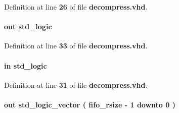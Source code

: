 Definition at line {\bf 26} of file {\bf decompress.\+vhd}.

\paragraph[{rdempty}]{ {\bfseries \textcolor{keywordflow}{out}\textcolor{vhdlchar}{ }} {\bfseries \textcolor{comment}{std\+\_\+logic}\textcolor{vhdlchar}{ }} \hspace{0.3cm}{\ttfamily [Port]}}\label{classdecompress_a9de411b2245efc9c1d528023e62102de}


Definition at line {\bf 33} of file {\bf decompress.\+vhd}.

\paragraph[{rdreq}]{ {\bfseries \textcolor{keywordflow}{in}\textcolor{vhdlchar}{ }} {\bfseries \textcolor{comment}{std\+\_\+logic}\textcolor{vhdlchar}{ }} \hspace{0.3cm}{\ttfamily [Port]}}\label{classdecompress_a664672374cb02f8b68a5ff0a74918b73}


Definition at line {\bf 31} of file {\bf decompress.\+vhd}.

\paragraph[{rdusedw}]{ {\bfseries \textcolor{keywordflow}{out}\textcolor{vhdlchar}{ }} {\bfseries \textcolor{comment}{std\+\_\+logic\+\_\+vector}\textcolor{vhdlchar}{ }\textcolor{vhdlchar}{(}\textcolor{vhdlchar}{ }\textcolor{vhdlchar}{ }\textcolor{vhdlchar}{ }\textcolor{vhdlchar}{ }{\bfseries {\bf fifo\+\_\+rsize}} \textcolor{vhdlchar}{-\/}\textcolor{vhdlchar}{ } \textcolor{vhdldigit}{1} \textcolor{vhdlchar}{ }\textcolor{keywordflow}{downto}\textcolor{vhdlchar}{ }\textcolor{vhdlchar}{ } \textcolor{vhdldigit}{0} \textcolor{vhdlchar}{ }\textcolor{vhdlchar}{)}\textcolor{vhdlchar}{ }} \hspace{0.3cm}{\ttfamily [Port]}}\label{classdecompress_a096d384434cae690bb7355ab3cd05eaa}


